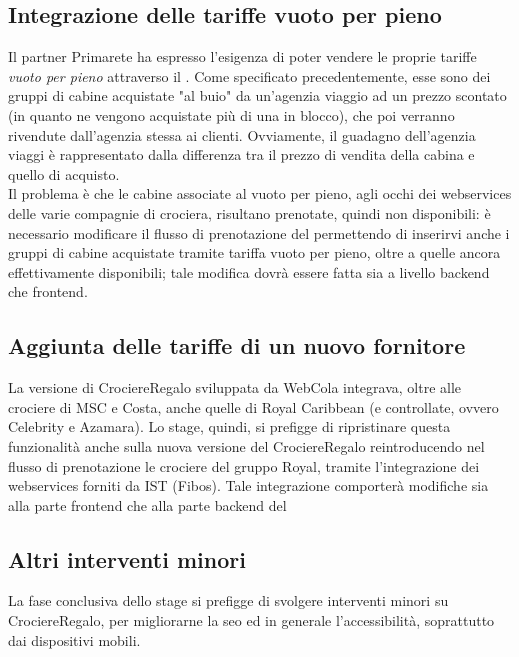 \subsection{Integrazione delle tariffe vuoto per pieno}
Il partner Primarete ha espresso l'esigenza di poter vendere le proprie tariffe \textit{vuoto per pieno} attraverso il \bookingEngine. Come specificato precedentemente, esse sono dei gruppi di cabine acquistate "al buio" da un'agenzia viaggio ad un prezzo scontato (in quanto ne vengono acquistate più di una in blocco), che poi verranno rivendute dall'agenzia stessa ai clienti. Ovviamente, il guadagno dell'agenzia viaggi è rappresentato dalla differenza tra il prezzo di vendita della cabina e quello di acquisto.\\
Il problema è che le cabine associate al vuoto per pieno, agli occhi dei \glspl{webservice} delle varie compagnie di crociera, risultano prenotate, quindi non disponibili: è necessario modificare il flusso di prenotazione del \bookingEngine\hphantom{i}permettendo di inserirvi anche i gruppi di cabine acquistate tramite tariffa vuoto per pieno, oltre a quelle ancora effettivamente disponibili; tale modifica dovrà essere fatta sia a livello backend che frontend.

\subsection{Aggiunta delle tariffe di un nuovo fornitore}
La versione di CrociereRegalo sviluppata da WebCola integrava, oltre alle crociere di MSC e Costa, anche quelle di Royal Caribbean (e controllate, ovvero Celebrity e Azamara). Lo stage, quindi, si prefigge di ripristinare questa funzionalità anche sulla nuova versione del \bookingEngine\hphantom{i}CrociereRegalo reintroducendo nel flusso di prenotazione le crociere del gruppo Royal, tramite l'integrazione dei \glspl{webservice} forniti da IST (Fibos). Tale integrazione comporterà modifiche sia alla parte frontend che alla parte backend del \bookingEngine


\subsection{Altri interventi minori}
\label{section:altri-interventi-minori}
La fase conclusiva dello stage si prefigge di svolgere interventi minori su CrociereRegalo, per migliorarne la \gls{seo} ed in generale l'accessibilità, soprattutto dai dispositivi mobili.

